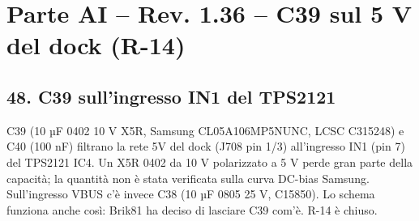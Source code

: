 \clearpage
\section[Parte AI – Rev. 1.36 – C39 sul 5 V del dock (R-14)]{Parte AI – Rev. 1.36 – C39 sul 5 V del dock (R-14)}

\subsection[48. C39 sull'ingresso IN1 del TPS2121]{48. C39 sull'ingresso IN1 del TPS2121}

C39 (10 µF 0402 10 V X5R, Samsung CL05A106MP5NUNC, LCSC C315248) e C40 (100 nF) filtrano la rete 5V del dock (J708 pin 1/\allowbreak{}3) all'ingresso IN1 (pin 7) del TPS2121 IC4. Un X5R 0402 da 10 V polarizzato a 5 V perde gran parte della capacità; la quantità non è stata verificata sulla curva DC-bias Samsung. Sull'ingresso VBUS c'è invece C38 (10 µF 0805 25 V, C15850). Lo schema funziona anche così: Brik81 ha deciso di lasciare C39 com'è. R-14 è chiuso.
